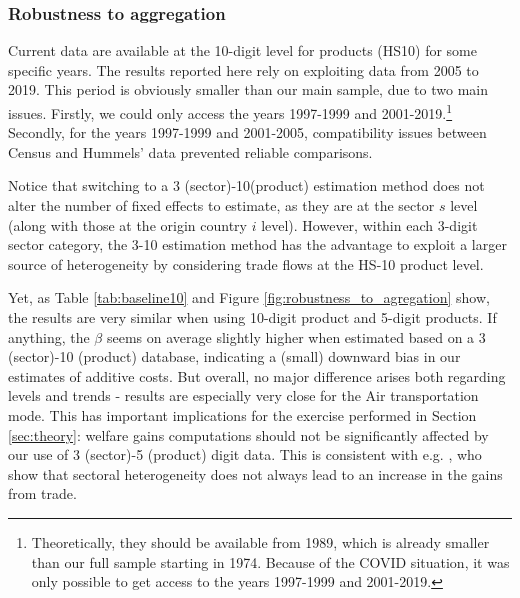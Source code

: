\documentclass[a4paper,11pt]{article}
\begin{document}


\subsubsection{Robustness to aggregation}

Current data are available at the 10-digit level for products (HS10) for some specific years. The results reported here rely on exploiting data from 2005 to 2019. This period is obviously smaller than our main sample, due to two main issues. Firstly, we could only access the years 1997-1999 and 2001-2019.\footnote{Theoretically, they should be available from 1989, which is already smaller than our full sample starting in 1974. Because of the COVID situation, it was only possible to get access to the years 1997-1999 and 2001-2019.} Secondly, for the years 1997-1999 and 2001-2005, compatibility issues between Census and Hummels' data prevented reliable comparisons.


Notice that switching to a 3 (sector)-10(product) estimation method does not alter the number of fixed effects to estimate, as they are at the sector $s$ level (along with those at the origin country $i$ level). However, within each 3-digit sector category, the 3-10 estimation method has the advantage to exploit a larger source of heterogeneity by considering trade flows at the HS-10 product level.

Yet, as Table \ref{tab:baseline10} and 	Figure \ref{fig:robustness_to_agregation} show, the results are very similar when using 10-digit product and 5-digit products. If anything, the $\beta$ seems on average slightly higher when estimated based on a 3 (sector)-10 (product) database, indicating a (small) downward bias in our estimates of additive costs. But overall, no major difference arises both regarding levels and trends - results are especially very close for the Air transportation mode. This has important implications for the exercise performed in Section \ref{sec:theory}: welfare gains computations should not be significantly affected by our use of 3 (sector)-5 (product) digit data. This is consistent with e.g. \citet{Giri_et_al2021}, who show that sectoral heterogeneity does not always lead to an increase in the gains from trade.
\end{document}
